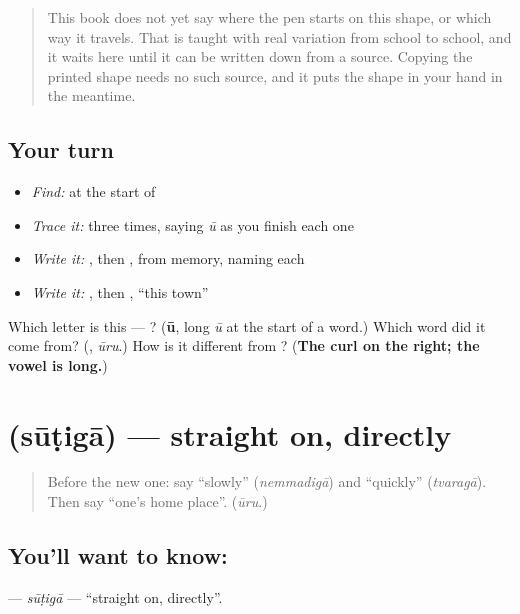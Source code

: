 \begin{quote}
This book does not yet say where the pen starts on this shape, or which way it travels. That is taught with real variation from school to school, and it waits here until it can be written down from a source. Copying the printed shape needs no such source, and it puts the shape in your hand in the meantime.
\end{quote}

\subsection*{Your turn}
\begin{itemize}
\raggedright
  \item \emph{Find:}  at the start of \textbf{}
  \item \emph{Trace it:}  three times, saying \emph{ū} as you finish each one
  \item \emph{Write it:} , then , from memory, naming each
  \item \emph{Write it:} \textbf{}, then \textbf{ }, \textquotedblleft{}this town\textquotedblright{}
\end{itemize}

\begin{tcolorbox}[breakable,colback=teal!4,colframe=teal!35!black,title={Before you move on}]
Which letter is this — ? (\textbf{ū}, long \emph{ū} at the start of a word.) Which word did it come from? (\textbf{}, \emph{ūru}.) How is it different from \textbf{}? (\textbf{The curl on the right; the vowel is long.})
\end{tcolorbox}
\section[\texorpdfstring{\te{సూటిగా} (sūṭigā)}{సూటిగా (sūṭigā)}]{ (sūṭigā) — straight on, directly}

\label{lesson:TE-C320-sutiga}



\begin{quote}
Before the new one: say \textquotedblleft{}slowly\textquotedblright{} (\emph{nemmadigā}) and \textquotedblleft{}quickly\textquotedblright{} (\emph{tvaragā}). Then say \textquotedblleft{}one's home place\textquotedblright{}. (\emph{ūru}.)
\end{quote}

\subsection*{You'll want to know: }
\textbf{} — \emph{sūṭigā} — \textquotedblleft{}straight on, directly\textquotedblright{}.

